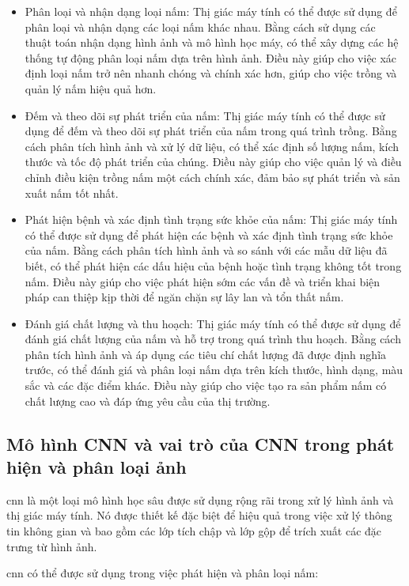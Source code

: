 \begin{itemize}
    \item Phân loại và nhận dạng loại nấm: Thị giác máy tính có thể được sử dụng để phân loại và nhận dạng các loại nấm khác nhau. Bằng cách sử dụng các thuật toán nhận dạng hình ảnh và mô hình học máy, có thể xây dựng các hệ thống tự động phân loại nấm dựa trên hình ảnh. Điều này giúp cho việc xác định loại nấm trở nên nhanh chóng và chính xác hơn, giúp cho việc trồng và quản lý nấm hiệu quả hơn.
    \item Đếm và theo dõi sự phát triển của nấm: Thị giác máy tính có thể được sử dụng để đếm và theo dõi sự phát triển của nấm trong quá trình trồng. Bằng cách phân tích hình ảnh và xử lý dữ liệu, có thể xác định số lượng nấm, kích thước và tốc độ phát triển của chúng. Điều này giúp cho việc quản lý và điều chỉnh điều kiện trồng nấm một cách chính xác, đảm bảo sự phát triển và sản xuất nấm tốt nhất.
    \item Phát hiện bệnh và xác định tình trạng sức khỏe của nấm: Thị giác máy tính có thể được sử dụng để phát hiện các bệnh và xác định tình trạng sức khỏe của nấm. Bằng cách phân tích hình ảnh và so sánh với các mẫu dữ liệu đã biết, có thể phát hiện các dấu hiệu của bệnh hoặc tình trạng không tốt trong nấm. Điều này giúp cho việc phát hiện sớm các vấn đề và triển khai biện pháp can thiệp kịp thời để ngăn chặn sự lây lan và tổn thất nấm.
    \item Đánh giá chất lượng và thu hoạch: Thị giác máy tính có thể được sử dụng để đánh giá chất lượng của nấm và hỗ trợ trong quá trình thu hoạch. Bằng cách phân tích hình ảnh và áp dụng các tiêu chí chất lượng đã được định nghĩa trước, có thể đánh giá và phân loại nấm dựa trên kích thước, hình dạng, màu sắc và các đặc điểm khác. Điều này giúp cho việc tạo ra sản phẩm nấm có chất lượng cao và đáp ứng yêu cầu của thị trường.
\end{itemize}


\subsection{Mô hình CNN và vai trò của CNN trong phát hiện và phân loại ảnh}

\acrfull{cnn} là một loại mô hình học sâu được sử dụng rộng rãi trong xử lý hình ảnh và thị giác máy tính. Nó được thiết kế đặc biệt để hiệu quả trong việc xử lý thông tin không gian và bao gồm các lớp tích chập và lớp gộp để trích xuất các đặc trưng từ hình ảnh.

\acrshort{cnn} có thể được sử dụng trong việc phát hiện và phân loại nấm:

